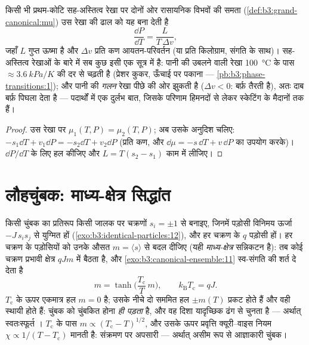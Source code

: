 \begin{proposition}[क्लॉसियस--क्लापेरों]\label{prop:b3:phase-transitions:clapeyron}
किसी भी प्रथम-कोटि सह-अस्तित्व रेखा पर दोनों ओर रासायनिक
विभवों की समता
(\cref{def:b3:grand-canonical:mu}) उस रेखा की ढाल को यह बना देती है
\[
\frac{\dd P}{\dd T} = \frac{L}{T\,\Delta v} ,
\]
जहाँ $L$ गुप्त ऊष्मा है और $\Delta v$ प्रति कण आयतन-परिवर्तन (या
प्रति किलोग्राम, संगति के साथ)। सह-अस्तित्व रेखाओं के बारे में सब कुछ
इसी एक सूत्र में है: पानी की उबलने वाली रेखा \qty{100}{\celsius} के
पास $\approx\qty{3.6}{kPa/K}$ की दर से चढ़ती है
(प्रेशर कुकर, ऊँचाई पर पकाना ---
\cref{pb:b3:phase-transitions:1}); और पानी की \emph{गलन} रेखा
पीछे की ओर झुकती है ($\Delta v < 0$: बर्फ़ तैरती है), अतः दाब बर्फ़
पिघला देता है --- पदार्थों में एक दुर्लभ बात, जिसके परिणाम हिमनदों से
लेकर स्केटिंग के मैदानों तक हैं।
\end{proposition}

\begin{proof}
उस रेखा पर $\mu_1(T, P) = \mu_2(T, P)$; अब उसके अनुदिश चलिए:
$-s_1\dd T + v_1\dd P = -s_2\dd T + v_2\dd P$ (प्रति कण, और
$\dd\mu = -s\,\dd T + v\,\dd P$ का उपयोग करके)। $\dd P/\dd T$ के लिए
हल कीजिए और $L = T(s_2 - s_1)$ काम में लीजिए।
\end{proof}

\section{लौहचुंबक: माध्य-क्षेत्र सिद्धांत}

\begin{theorem}\label{thm:b3:phase-transitions:meanfield}
किसी चुंबक का प्रतिरूप किसी जालक पर चक्रणों $s_i = \pm1$ से बनाइए,
जिनमें पड़ोसी विनिमय ऊर्जा $-J\,s_is_j$ से युग्मित हों
(\cref{exo:b3:identical-particles:12}), और हर चक्रण के $q$
पड़ोसी हों। हर चक्रण के पड़ोसियों को उनके औसत $m =
\langle s\rangle$ से बदल दीजिए (यही \emph{माध्य-क्षेत्र} सन्निकटन
है): तब कोई चक्रण प्रभावी क्षेत्र $qJm$ में बैठता है, और
\cref{exo:b3:canonical-ensemble:11} स्व-संगति की शर्त दे देता है
\[
m = \tanh\!\Big(\frac{T_{\text{c}}}{T}\,m\Big) , \qquad
k_{\text{B}}T_{\text{c}} = qJ .
\]
$T_{\text{c}}$ के ऊपर एकमात्र हल $m = 0$ है; उसके नीचे दो
सममित हल $\pm m(T)$ प्रकट होते हैं और वही स्थायी होते हैं: चुंबक को
चुंबकित होना \emph{ही पड़ता} है, और वह दिशा यादृच्छिक ढंग से चुनता है
--- अर्थात् स्वतःस्फूर्त । $T_{\text{c}}$ के पास $m \propto
(T_{\text{c}} - T)^{1/2}$, और उसके ऊपर प्रवृत्ति
क्यूरी--वाइस नियम $\chi \propto 1/(T - T_{\text{c}})$ मानती है:
संक्रमण पर अपसारी --- अर्थात् असीम रूप से आज्ञाकारी चुंबक।
\end{theorem}

